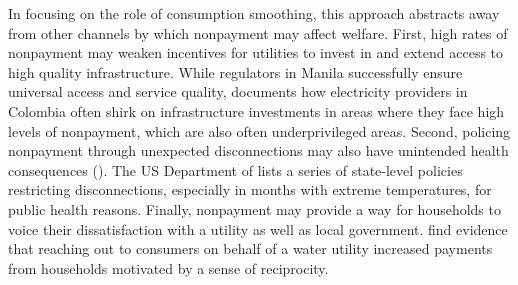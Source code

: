\documentclass[12pt,table]{article}
\begin{document}
In focusing on the role of consumption smoothing, this approach abstracts away from other channels by which nonpayment may affect welfare.  First, high rates of nonpayment may weaken incentives for utilities to invest in and extend access to high quality infrastructure.  While regulators in Manila successfully ensure universal access and service quality, \cite{mcrae2015infrastructure} documents how electricity providers in Colombia often shirk on infrastructure investments in areas where they face high levels of nonpayment, which are also often underprivileged areas.  Second, policing nonpayment through unexpected disconnections may also have unintended health consequences (\cite{franklin2017}).  The US Department of \cite{liheap} lists a series of state-level policies restricting disconnections, especially in months with extreme temperatures, for public health reasons.  Finally, nonpayment may provide a way for households to voice their dissatisfaction with a utility as well as local government.  \cite{szabo2015reducing} find evidence that reaching out to consumers on behalf of a water utility increased payments from households motivated by a sense of reciprocity.  







\end{document}
